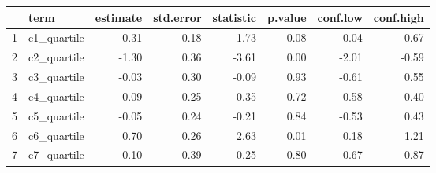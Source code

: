 \documentclass{article}
\begin{document}


\begin{table}[ht]
\centering
\begin{tabular}{rlrrrrrr}
  \hline
 & term & estimate & std.error & statistic & p.value & conf.low & conf.high \\
  \hline
1 & c1\_quartile & 0.31 & 0.18 & 1.73 & 0.08 & -0.04 & 0.67 \\
  2 & c2\_quartile & -1.30 & 0.36 & -3.61 & 0.00 & -2.01 & -0.59 \\
  3 & c3\_quartile & -0.03 & 0.30 & -0.09 & 0.93 & -0.61 & 0.55 \\
  4 & c4\_quartile & -0.09 & 0.25 & -0.35 & 0.72 & -0.58 & 0.40 \\
  5 & c5\_quartile & -0.05 & 0.24 & -0.21 & 0.84 & -0.53 & 0.43 \\
  6 & c6\_quartile & 0.70 & 0.26 & 2.63 & 0.01 & 0.18 & 1.21 \\
  7 & c7\_quartile & 0.10 & 0.39 & 0.25 & 0.80 & -0.67 & 0.87 \\
   \hline
\end{tabular}
\end{table}
\end{document}
